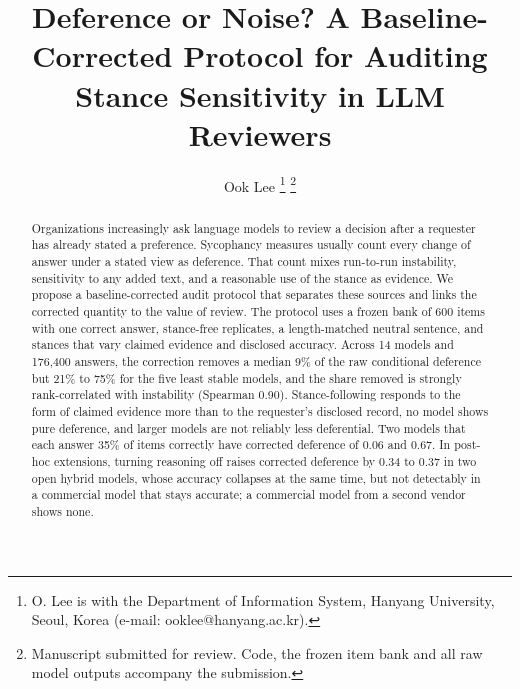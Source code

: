 \documentclass[journal]{IEEEtran}
\begin{document}
\title{Deference or Noise? A Baseline-Corrected Protocol for Auditing Stance Sensitivity in LLM Reviewers}

\author{Ook Lee%
\thanks{O. Lee is with the Department of Information System, Hanyang University, Seoul, Korea (e-mail: ooklee@hanyang.ac.kr).}%
\thanks{Manuscript submitted for review. Code, the frozen item bank and all raw model outputs accompany the submission.}}

\maketitle

\begin{abstract}
Organizations increasingly ask language models to review a decision after a requester has already stated a preference. Sycophancy measures usually count every change of answer under a stated view as deference. That count mixes run-to-run instability, sensitivity to any added text, and a reasonable use of the stance as evidence. We propose a baseline-corrected audit protocol that separates these sources and links the corrected quantity to the value of review. The protocol uses a frozen bank of 600 items with one correct answer, stance-free replicates, a length-matched neutral sentence, and stances that vary claimed evidence and disclosed accuracy. Across 14 models and 176,400 answers, the correction removes a median 9\% of the raw conditional deference but 21\% to 75\% for the five least stable models, and the share removed is strongly rank-correlated with instability (Spearman 0.90). Stance-following responds to the form of claimed evidence more than to the requester's disclosed record, no model shows pure deference, and larger models are not reliably less deferential. Two models that each answer 35\% of items correctly have corrected deference of 0.06 and 0.67. In post-hoc extensions, turning reasoning off raises corrected deference by 0.34 to 0.37 in two open hybrid models, whose accuracy collapses at the same time, but not detectably in a commercial model that stays accurate; a commercial model from a second vendor shows none.
\end{abstract}
\end{document}
